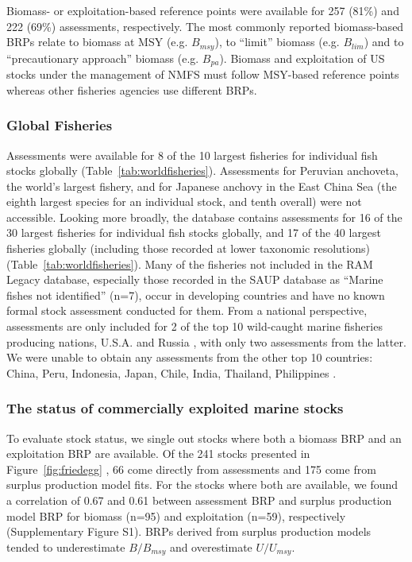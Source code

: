 Biomass- or exploitation-based reference points were available for
257 (81\%) and
222 (69\%)
assessments, respectively. The most commonly reported biomass-based
BRPs relate to biomass at MSY (e.g. $B_{msy}$), to ``limit'' biomass
(e.g. $B_{lim}$) and to ``precautionary approach'' biomass (e.g.
$B_{pa}$). Biomass and exploitation of US stocks under the management
of NMFS must follow MSY-based reference points whereas other fisheries
agencies use different BRPs.

\subsubsection*{Global Fisheries}
Assessments were available for 8 of the 10 largest fisheries for
individual fish stocks globally (Table~\ref{tab:worldfisheries}). Assessments for Peruvian
anchoveta, the world's largest fishery, and for Japanese anchovy in
the East China Sea (the eighth largest species for an individual
stock, and tenth overall) were not accessible. Looking more broadly,
the database contains assessments for 16 of the 30 largest fisheries
for individual fish stocks globally, and 17 of the 40 largest
fisheries globally (including those recorded at lower taxonomic
resolutions) (Table~\ref{tab:worldfisheries}). Many of the fisheries not included in the RAM
Legacy database, especially those recorded in the SAUP database as
``Marine fishes not identified'' (n=7), occur in developing countries
and have no known formal stock assessment conducted for them.  From a
national perspective, assessments are only included for 2 of the top
10 wild-caught marine fisheries producing nations, U.S.A. and Russia
\citep{FAO:sofia}, with only two assessments from the latter. We were unable
to obtain any assessments from the other top 10 countries: China,
Peru, Indonesia, Japan, Chile, India, Thailand, Philippines \citep{FAO:sofia}.

\subsubsection*{The status of commercially exploited marine stocks }
To evaluate stock status, we single out stocks where both a biomass
BRP and an exploitation BRP are available. Of the
241 stocks presented in
Figure~\ref{fig:friedegg} , 66 come
directly from assessments and 175 come
from surplus production model fits. For the stocks where both are
available, we found a correlation of 0.67 and
0.61 between assessment BRP and surplus production
model BRP for biomass (n=95) and exploitation (n=59), respectively (Supplementary
Figure S1). BRPs derived from surplus production models tended to
underestimate $B/B_{msy}$ and overestimate $U/U_{msy}$.

